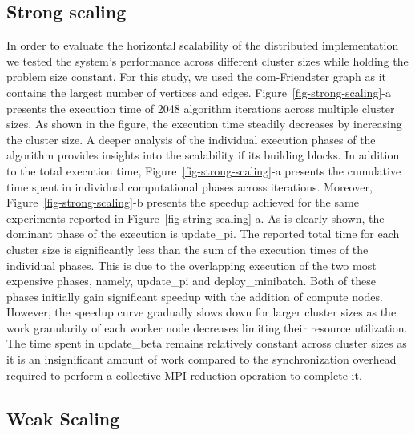 \subsection{Strong scaling}

\begin{figure*}[t] %
  \centering
  \caption{Strong scaling: Execution time of 2048 algorithm iterations for the
  same problem size (com-Friendster, K=1024, M=16384 n=32) across different
  cluster sizes.}
  \label{fig-strong-scaling}
\end{figure*}

In order to evaluate the horizontal scalability of the distributed
implementation we tested the system's performance across different cluster
sizes while holding the problem size constant. For this study, we used the
com-Friendster graph as it contains the largest number of vertices and edges.
%
Figure~\ref{fig-strong-scaling}-a presents the execution time of 2048 algorithm
iterations across multiple cluster sizes. As shown in the figure, the execution
time steadily decreases by increasing the cluster size.
A deeper analysis of the individual execution phases of the algorithm provides
insights into the scalability if its building blocks.
%
In addition to the total execution time, Figure~\ref{fig-strong-scaling}-a
presents the cumulative time spent in individual computational phases across
iterations. Moreover, Figure~\ref{fig-strong-scaling}-b presents the speedup
achieved for the same experiments reported in
Figure~\ref{fig-string-scaling}-a. As is clearly shown, the dominant phase of
the execution is update\_pi.
The reported total time for each cluster size is significantly less than the
sum of the execution times of the individual phases. This is due to the
overlapping execution of the two most expensive phases, namely, update\_pi and
deploy\_minibatch. Both of these phases initially gain significant speedup with the
addition of compute nodes. However, the speedup curve gradually slows down for
larger cluster sizes as the work granularity of each worker node decreases
limiting their resource utilization.
%
The time spent in update\_beta remains relatively constant across cluster
sizes as it is an insignificant amount of work compared to the synchronization
overhead required to perform a collective MPI reduction operation to complete
it.

\subsection{Weak Scaling}

